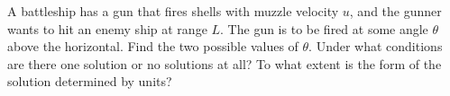 A battleship has a gun that fires shells with muzzle velocity $u$,
and the gunner wants to hit an enemy ship at range $L$. The gun is
to be fired at some angle $\theta$ above the horizontal. Find the
two possible values of $\theta$. Under what conditions are there
one solution or no solutions at all? To what extent is the form of
the solution determined by units?

